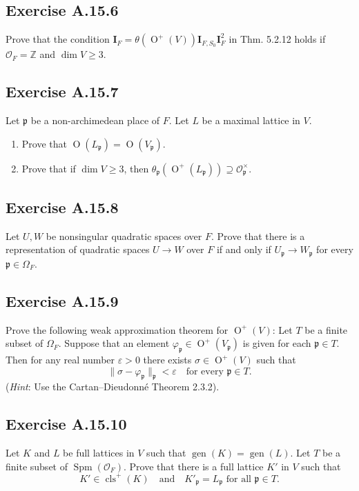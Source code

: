 \documentclass[12pt, a4paper]{article}
\begin{document}
\subsection*{Exercise A.15.6}
Prove that the condition $\mathbf{I}_F = \theta(\operatorname{O}^+(V))\mathbf{I}_{F, S_0} \mathbf{I}_F^2$ in Thm. 5.2.12 holds if $\mathcal{O}_F = \mathbb{Z}$ and $\dim V \ge 3$.

\subsection*{Exercise A.15.7}
Let $\mathfrak{p}$ be a non-archimedean place of $F$. Let $L$ be a maximal lattice in $V$.
\begin{enumerate}
    \item Prove that $\operatorname{O}(L_{\mathfrak{p}}) = \operatorname{O}(V_{\mathfrak{p}})$.
    \item Prove that if $\dim V \ge 3$, then $\theta_{\mathfrak{p}}(\operatorname{O}^+(L_{\mathfrak{p}})) \supseteq \mathcal{O}_{\mathfrak{p}}^\times$.
\end{enumerate}

\subsection*{Exercise A.15.8}
Let $U, W$ be nonsingular quadratic spaces over $F$. Prove that there is a representation of quadratic spaces $U \to W$ over $F$ if and only if $U_{\mathfrak{p}} \to W_{\mathfrak{p}}$ for every $\mathfrak{p} \in \Omega_F$.

\subsection*{Exercise A.15.9}
Prove the following weak approximation theorem for $\operatorname{O}^+(V)$: Let $T$ be a finite subset of $\Omega_F$. Suppose that an element $\varphi_{\mathfrak{p}} \in \operatorname{O}^+(V_{\mathfrak{p}})$ is given for each $\mathfrak{p} \in T$. Then for any real number $\varepsilon > 0$ there exists $\sigma \in \operatorname{O}^+(V)$ such that
\[ \| \sigma - \varphi_{\mathfrak{p}} \|_{\mathfrak{p}} < \varepsilon \quad \text{for every } \mathfrak{p} \in T . \]
(\textit{Hint}: Use the Cartan--Dieudonné Theorem 2.3.2).

\subsection*{Exercise A.15.10}
Let $K$ and $L$ be full lattices in $V$ such that $\operatorname{gen}(K) = \operatorname{gen}(L)$. Let $T$ be a finite subset of $\operatorname{Spm}(\mathcal{O}_F)$. Prove that there is a full lattice $K'$ in $V$ such that
\[ K' \in \operatorname{cls}^+(K) \quad \text{and} \quad K'_{\mathfrak{p}} = L_{\mathfrak{p}} \text{ for all } \mathfrak{p} \in T . \]
\end{document}

